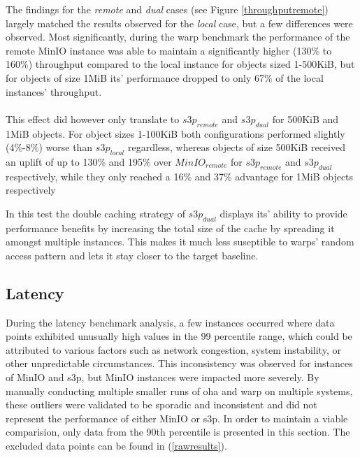 The findings for the \textit{remote} and \textit{dual} cases (see Figure \ref{throughputremote}) largely matched the results observed for the \textit{local} case, but a few differences were observed. 
Most significantly, during the warp benchmark the performance of the remote MinIO instance was able to maintain a significantly higher (130\% to 160\%) throughput compared to the local instance for objects sized 1-500KiB, but for objects of size 1MiB its' performance dropped to only 67\% of the local instances' throughput.
\\\\
This effect did however only translate to ${s3p}_{remote}$ and ${s3p}_{dual}$ for 500KiB and 1MiB objects. For object sizes 1-100KiB both configurations performed slightly (4\%-8\%) worse than ${s3p}_{local}$ regardless, whereas objects of size 500KiB received an uplift of up to 130\% and 195\% over ${MinIO}_{remote}$ for ${s3p}_{remote}$ and ${s3p}_{dual}$ respectively, while they only reached a 16\% and 37\% advantage for 1MiB objects respectively

In this test the double caching strategy of ${s3p}_{dual}$ displays its' ability to provide performance benefits by increasing the total size of the cache by spreading it amongst multiple instances. This makes it much less suseptible to warps' random access pattern and lets it stay closer to the target baseline.

\subsection{Latency}


During the latency benchmark analysis, a few instances occurred where data points exhibited unusually high values in the 99 percentile range, which could be attributed to various factors such as network congestion, system instability, or other unpredictable circumstances. This inconsistency was observed for instances of MinIO and s3p, but MinIO instances were impacted more severely. By manually conducting multiple smaller runs of oha and warp on multiple systems, these outliers were validated to be sporadic and inconsistent and did not represent the performance of either MinIO or s3p. In order to maintain a viable comparision, only data from the 90th percentile is presented in this section. The excluded data points can be found in (\ref{rawresults}).

\latlocalminio
{}\latlocalminiooha

